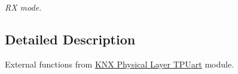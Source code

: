 \begin{DoxyCompactItemize}
\begin{DoxyCompactList}\small\item\em RX mode. \end{DoxyCompactList}\end{DoxyCompactItemize}


\subsection{Detailed Description}
External functions from \hyperlink{group___k_n_x___p_h___t_p_uart}{K\+NX Physical Layer T\+P\+Uart} module. 

